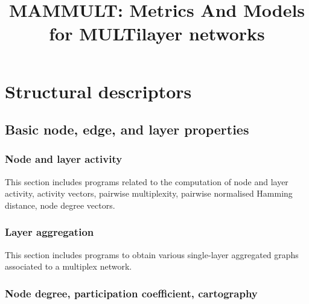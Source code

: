 \documentclass[a4paper,11pt]{book}
\title{MAMMULT: Metrics And Models for MULTilayer networks}
\begin{document}
\maketitle
\tableofcontents

\chapter{Structural descriptors}

\section{Basic node, edge, and layer properties}

\subsection{Node and layer activity}

This section includes programs related to the computation of node and
layer activity, activity vectors, pairwise multiplexity, pairwise
normalised Hamming distance, node degree vectors.











\clearpage

\subsection{Layer aggregation}

This section includes programs to obtain various single-layer
aggregated graphs associated to a multiplex network. 



\clearpage

\subsection{Node degree, participation coefficient, cartography}
\end{document}
